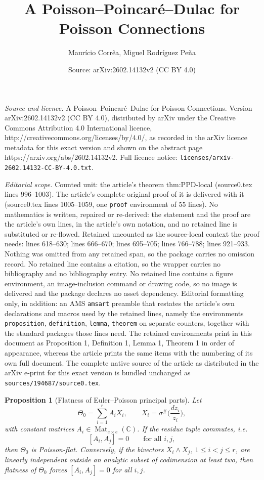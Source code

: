 \documentclass[10pt,a4paper]{amsart}
\title{A Poisson--Poincar\'e--Dulac for Poisson Connections}
\author{Maur\'icio Corr\^ea, Miguel Rodr\'iguez Pe\~na}
\date{Source: arXiv:2602.14132v2 (CC BY 4.0)}
\newtheorem{proposition}{Proposition}
\newcommand{\C}{\mathbb{C}}
\DeclareMathOperator{\Mat}{Mat}
\begin{document}
\maketitle

\noindent\emph{Source and licence.} A Poisson--Poincar\'e--Dulac for Poisson Connections. Version arXiv:2602.14132v2 (CC BY 4.0), distributed by arXiv under the Creative Commons Attribution 4.0 International licence, http://creativecommons.org/licenses/by/4.0/, as recorded in the arXiv licence metadata for this exact version and shown on the abstract page https://arxiv.org/abs/2602.14132v2. Full licence notice: \texttt{licenses/arxiv-2602.14132-CC-BY-4.0.txt}.\par\smallskip

\noindent\textit{Editorial scope.} Counted unit: the article's theorem thm:PPD-local (source0.tex lines 996--1003). The article's complete original proof of it is delivered with it (source0.tex lines 1005--1059, one \texttt{proof} environment of 55 lines). No mathematics is written, repaired or re-derived: the statement and the proof are the article's own lines, in the article's own notation, and no retained line is substituted or re-flowed.  Retained uncounted as the source-local context the proof needs: lines 618--630; lines 666--670; lines 695--705; lines 766--788; lines 921--933.  Nothing was omitted from any retained span, so the package carries no omission record.  No retained line contains a citation, so the wrapper carries no bibliography and no bibliography entry.  No retained line contains a figure environment, an image-inclusion command or drawing code, so no image is delivered and the package declares no asset dependency.  Editorial formatting only, in addition: an AMS \texttt{amsart} preamble that restates the article's own declarations and macros used by the retained lines, namely the environments \texttt{proposition}, \texttt{definition}, \texttt{lemma}, \texttt{theorem} on separate counters, together with the standard packages those lines need.  The retained environments print in this document as Proposition 1, Definition 1, Lemma 1, Theorem 1 in order of appearance, whereas the article prints the same items with the numbering of its own full document.  The complete native source of the article as distributed in the arXiv e-print for this exact version is bundled unchanged as \texttt{sources/194687/source0.tex}.
\begin{proposition}[Flatness of Euler--Poisson principal parts]\label{prop:EP-flat}
Let
$$
\Theta_0=\sum_{i=1}^r A_iX_i,
\qquad
X_i=\sigma^\# \Big(\frac{dz_i}{z_i}\Big),
$$
with constant matrices $A_i\in\Mat_{e\times e}(\C)$. If the residue tuple commutes, i.e.
$$
[A_i,A_j]=0\qquad\text{for all }i,j,
$$
then $\Theta_0$ is Poisson-flat. Conversely, if the bivectors $X_i\wedge X_j$, $1\le i<j\le r$, are linearly independent outside an analytic subset of codimension at least two, then flatness of $\Theta_0$ forces $[A_i,A_j]=0$ for all $i,j$.
\end{proposition}
\end{document}
